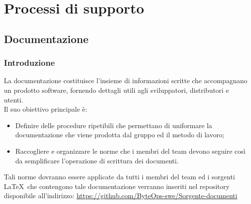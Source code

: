 \documentclass{article}
\begin{document}
\section{Processi di supporto}

\subsection{Documentazione}

\subsubsection{Introduzione}
La documentazione costituisce l'insieme di informazioni scritte che accompagnano un prodotto software, fornendo dettagli utili agli sviluppatori, distributori e utenti.\\
Il suo obiettivo principale è:
\begin{itemize}
    \item  Definire delle procedure ripetibili che permettano di uniformare la documentazione che viene prodotta dal gruppo ed il metodo di lavoro;
    \item  Raccogliere e organizzare le norme che i membri del team devono seguire così da semplificare l'operazione di scrittura dei documenti.
\end{itemize}
Tali norme dovranno essere applicate da tutti i membri del team ed i sorgenti \LaTeX\ che contengono tale documentazione verranno inseriti nel repository disponibile all'indirizzo:
\href{https://github.com/ByteOps-swe/Sorgente-documenti}{https://github.com/ByteOps-swe/Sorgente-documenti}

\end{document}
